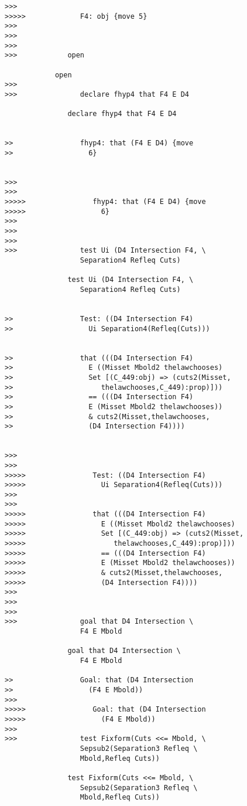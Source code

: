 \documentclass[12pt]{article}
\begin{document}
\begin{verbatim}
>>>
>>>>>             F4: obj {move 5}
>>>
>>>
>>>
>>>            open

            open
>>>
>>>               declare fhyp4 that F4 E D4

               declare fhyp4 that F4 E D4


>>                fhyp4: that (F4 E D4) {move
>>                  6}


>>>
>>>
>>>>>                fhyp4: that (F4 E D4) {move
>>>>>                  6}
>>>
>>>
>>>
>>>               test Ui (D4 Intersection F4, \
                  Separation4 Refleq Cuts)

               test Ui (D4 Intersection F4, \
                  Separation4 Refleq Cuts)


>>                Test: ((D4 Intersection F4)
>>                  Ui Separation4(Refleq(Cuts)))


>>                that (((D4 Intersection F4)
>>                  E ((Misset Mbold2 thelawchooses)
>>                  Set [(C_449:obj) => (cuts2(Misset,
>>                     thelawchooses,C_449):prop)]))
>>                  == (((D4 Intersection F4)
>>                  E (Misset Mbold2 thelawchooses))
>>                  & cuts2(Misset,thelawchooses,
>>                  (D4 Intersection F4))))


>>>
>>>
>>>>>                Test: ((D4 Intersection F4)
>>>>>                  Ui Separation4(Refleq(Cuts)))
>>>
>>>
>>>>>                that (((D4 Intersection F4)
>>>>>                  E ((Misset Mbold2 thelawchooses)
>>>>>                  Set [(C_449:obj) => (cuts2(Misset,
>>>>>                     thelawchooses,C_449):prop)]))
>>>>>                  == (((D4 Intersection F4)
>>>>>                  E (Misset Mbold2 thelawchooses))
>>>>>                  & cuts2(Misset,thelawchooses,
>>>>>                  (D4 Intersection F4))))
>>>
>>>
>>>
>>>               goal that D4 Intersection \
                  F4 E Mbold

               goal that D4 Intersection \
                  F4 E Mbold

>>                Goal: that (D4 Intersection
>>                  (F4 E Mbold))
>>>
>>>>>                Goal: that (D4 Intersection
>>>>>                  (F4 E Mbold))
>>>
>>>               test Fixform(Cuts <<= Mbold, \
                  Sepsub2(Separation3 Refleq \
                  Mbold,Refleq Cuts))

               test Fixform(Cuts <<= Mbold, \
                  Sepsub2(Separation3 Refleq \
                  Mbold,Refleq Cuts))


\end{verbatim}
\end{document}
